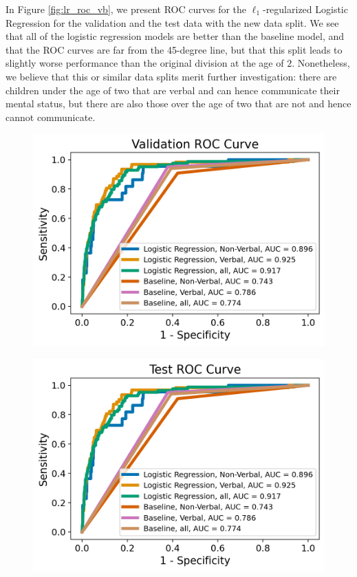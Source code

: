 \documentclass[11pt, letterpaper]{amsart}
\begin{document}
In Figure \ref{fig:lr_roc_vb}, we present ROC curves for the $\ell_1$-regularized Logistic Regression for the validation and the test data with the new data split. We see that all of the logistic regression models are better than the baseline model, and that the ROC curves are far from the 45-degree line, but that this split leads to slightly worse performance than the original division at the age of $2$. Nonetheless, we believe that this or similar data splits merit further investigation: there are children under the age of two that are verbal and can hence communicate their mental status, but there are also those over the age of two that are not and hence cannot communicate. 
\begin{figure}
	\begin{minipage}[b]{0.5\linewidth}
		\centering
		\includegraphics[width=\textwidth]{lr_val_roc_verbal.png}
		\label{fig:lr_val_roc_vb}
	\end{minipage}%
	\begin{minipage}[b]{0.5\linewidth}
		\centering
		\includegraphics[width=\textwidth]{lr_test_roc_verbal.png}

\end{minipage}
\end{figure}
\end{document}
